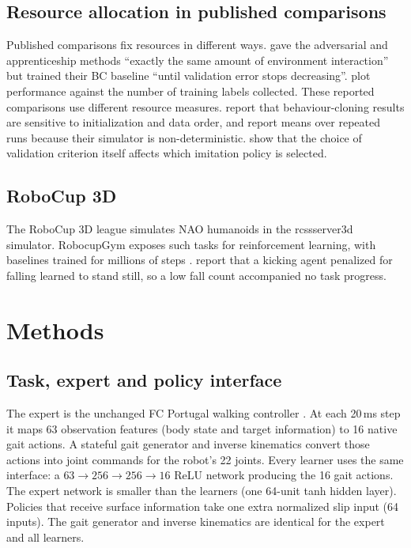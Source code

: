 \documentclass[conference]{IEEEtran}
\begin{document}
\subsection{Resource allocation in published comparisons}
Published comparisons fix resources in different ways. \citet{ho2016} gave the adversarial and apprenticeship methods ``exactly the same amount of environment interaction'' but trained their BC baseline ``until validation error stops decreasing''. \citet{ross2011} plot performance against the number of training labels collected. These reported comparisons use different resource measures. \citet{codevilla2019} report that behaviour-cloning results are sensitive to initialization and data order, and report means over repeated runs because their simulator is non-deterministic. \citet{hussenot2021} show that the choice of validation criterion itself affects which imitation policy is selected.

\subsection{RoboCup 3D}
The RoboCup 3D league simulates NAO humanoids in the rcssserver3d simulator. RobocupGym exposes such tasks for reinforcement learning, with baselines trained for millions of steps \citep{beukman2024}. \citet{ingram2023} report that a kicking agent penalized for falling learned to stand still, so a low fall count accompanied no task progress.

\section{Methods}

\subsection{Task, expert and policy interface}
The expert is the unchanged FC Portugal walking controller \citep{abreu2025}. At each 20\,ms step it maps 63 observation features (body state and target information) to 16 native gait actions. A stateful gait generator and inverse kinematics convert those actions into joint commands for the robot's 22 joints. Every learner uses the same interface: a $63\!\rightarrow\!256\!\rightarrow\!256\!\rightarrow\!16$ ReLU network producing the 16 gait actions. The expert network is smaller than the learners (one 64-unit tanh hidden layer). Policies that receive surface information take one extra normalized slip input (64 inputs). The gait generator and inverse kinematics are identical for the expert and all learners.
\end{document}
